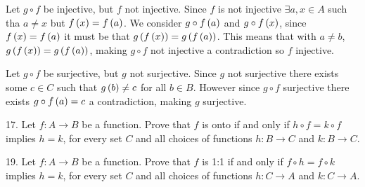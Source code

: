 \begin{mdframed}[style=darkAnswer,frametitle={Joe Starr}]
  Let $g\circ f$ be injective, but $f$ not injective. Since $f$ is not injective
  $\exists a,x\in A$ such tha $a\neq x$ but $f\left(x\right)=f\left(a\right)$. We consider
  $g\circ f\left(a\right)$ and $g\circ f\left(x\right)$, since $f\left(x\right)=f\left(a\right)$ it must be that
  $g\left(f\left(x\right)\right)=g\left(f\left(a\right)\right)$. This means that with $a\neq b$,
  $g\left(f\left(x\right)\right)=g\left(f\left(a\right)\right)$, making $g\circ f$ not injective a contradiction
  so $f$ injective.

  Let $g\circ f$ be surjective, but $g$ not surjective. Since $g$ not surjective
  there exists some $c\in C$ such that $g\left(b\right)\neq c$ for all $b\in B$. However
  since $g\circ f$ surjective there exists $g\circ f\left(a\right)=c$ a contradiction,
  making $g$ surjective.
\end{mdframed}
\newpage
\begin{mdframed}[style=darkQuesion]
  17. Let $f:A\to B$ be a function. Prove that $f$ is onto if and only if
  $h\circ f = k \circ f$ implies $h=k$, for every set $C$ and all choices of
  functions $h:B\to C$ and $k:B\to C$.
\end{mdframed}

\begin{mdframed}[style=darkAnswer,frametitle={Joe Starr}]

\end{mdframed}
\newpage
\begin{mdframed}[style=darkQuesion]
  19. Let $f:A\to B$ be a function. Prove that $f$ is 1:1 if and only if
  $f\circ h=f\circ k$ implies $h=k$, for every set $C$ and all choices of
  functions $h:C\to A$ and $k:C\to A$.
\end{mdframed}

